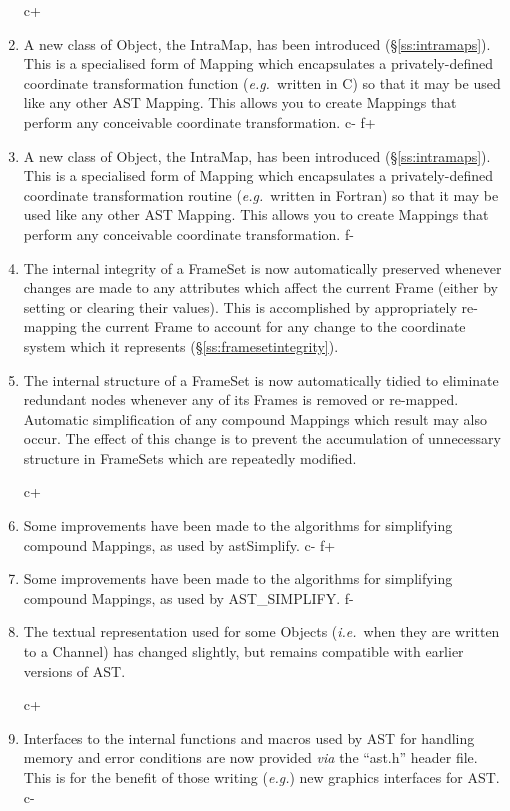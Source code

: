 \documentclass[twoside,11pt]{article}
\newcommand{\secref}[1]{\S\ref{#1}}
\newcommand{\secref}[1]{\ref{#1}}
\begin{document}
\begin{enumerate}
c+
\item A new class of Object, the IntraMap, has been introduced
(\secref{ss:intramaps}). This is a specialised form of Mapping which
encapsulates a privately-defined coordinate transformation function
({\em{e.g.}}\ written in C) so that it may be used like any other AST
Mapping. This allows you to create Mappings that perform any
conceivable coordinate transformation.
c-
f+
\item A new class of Object, the IntraMap, has been introduced
(\secref{ss:intramaps}). This is a specialised form of Mapping which
encapsulates a privately-defined coordinate transformation routine
({\em{e.g.}}\ written in Fortran) so that it may be used like any
other AST Mapping. This allows you to create Mappings that perform any
conceivable coordinate transformation.
f-

\item The internal integrity of a FrameSet is now automatically
preserved whenever changes are made to any attributes which affect the
current Frame (either by setting or clearing their values). This is
accomplished by appropriately re-mapping the current Frame to account
for any change to the coordinate system which it represents
(\secref{ss:framesetintegrity}).

\item The internal structure of a FrameSet is now automatically tidied
to eliminate redundant nodes whenever any of its Frames is removed or
re-mapped. Automatic simplification of any compound Mappings which
result may also occur. The effect of this change is to prevent the
accumulation of unnecessary structure in FrameSets which are
repeatedly modified.

c+
\item Some improvements have been made to the algorithms for
simplifying compound Mappings, as used by astSimplify.
c-
f+
\item Some improvements have been made to the algorithms for
simplifying compound Mappings, as used by AST\_SIMPLIFY.
f-

\item The textual representation used for some Objects
({\em{i.e.}}\ when they are written to a Channel) has changed
slightly, but remains compatible with earlier versions of AST.

c+
\item Interfaces to the internal functions and macros used by AST for
handling memory and error conditions are now provided {\em{via}} the
``ast.h'' header file. This is for the benefit of those writing
({\em{e.g.}}) new graphics interfaces for AST.
c-


\end{enumerate}
\end{document}

